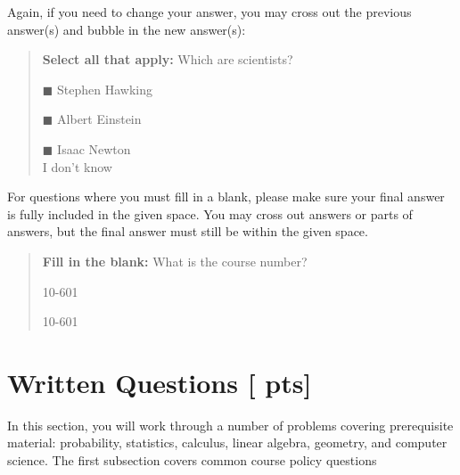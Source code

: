 \documentclass[11pt,addpoints,answers]{exam}
\numberwithin{equation}{section} %
\numberwithin{figure}{section} %
\numberwithin{table}{section} %
\newcommand{\pts}[1]{\textbf{[#1 pts]}}
\begin{document}
Again, if you need to change your answer, you may cross out the previous answer(s) and bubble in the new answer(s):

\begin{quote}
\textbf{Select all that apply:} Which are scientists?
    \begin{list}{}
    \item $\blacksquare$ Stephen Hawking 
    \item $\blacksquare$ Albert Einstein
    \item $\blacksquare$ Isaac Newton\\
    \xcancel{$\blacksquare$} I don't know
\end{list}
\end{quote}

For questions where you must fill in a blank, please make sure your final answer is fully included in the given space. You may cross out answers or parts of answers, but the final answer must still be within the given space.

\begin{quote}
\textbf{Fill in the blank:} What is the course number?

\begin{tcolorbox}[fit,height=1cm, width=4cm, blank, borderline={1pt}{-2pt},nobeforeafter]
    \begin{center}\huge10-601\end{center}
    \end{tcolorbox}\hspace{2cm}
    \begin{tcolorbox}[fit,height=1cm, width=4cm, blank, borderline={1pt}{-2pt},nobeforeafter]
    \begin{center}\huge10-601\end{center}
    \end{tcolorbox}
\end{quote}

\clearpage

\section{Written Questions \pts{\numpoints{}}}
In this section, you will work through a number of problems covering prerequisite material: probability, statistics, calculus, linear algebra, geometry, and computer science. The first subsection covers common course policy questions
\end{document}
